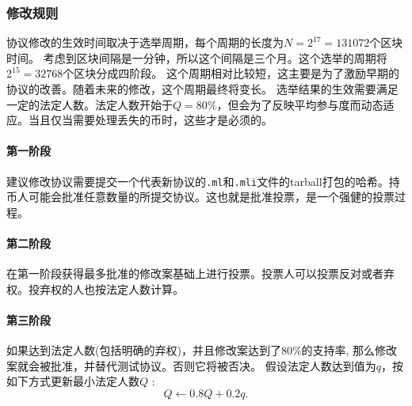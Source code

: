 \documentclass[letterpaper]{article}
\begin{document}
\subsubsection{修改规则}
 协议修改的生效时间取决于选举周期，每个周期的长度为$N = 2^{17} = \num{131072}$个区块时间。
 考虑到区块间隔是一分钟，所以这个间隔是三个月。这个选举的周期将$2^{15} = \num{32768}$个区块分成四阶段。
这个周期相对比较短，这主要是为了激励早期的协议的改善。随着未来的修改，这个周期最终将变长。
选举结果的生效需要满足一定的法定人数。法定人数开始于$Q = 80\%$，但会为了反映平均参与度而动态适应。当且仅当需要处理丢失的币时，这些才是必须的。

\paragraph{第一阶段}
建议修改协议需要提交一个代表新协议的\verb!.ml!和\verb!.mli!文件的tarball打包的哈希。持币人可能会批准任意数量的所提交协议。这也就是批准投票，是一个强健的投票过程。

\paragraph{第二阶段}
在第一阶段获得最多批准的修改案基础上进行投票。投票人可以投票反对或者弃权。投弃权的人也按法定人数计算。

\paragraph{第三阶段} %
如果达到法定人数(包括明确的弃权)，并且修改案达到了$80\%$的支持率, 那么修改案就会被批准，并替代测试协议。否则它将被否决。
假设法定人数达到值为$q$，按如下方式更新最小法定人数$Q$ :
$$Q \leftarrow 0.8 Q + 0.2 q.$$
\end{document}
